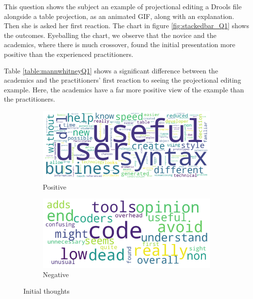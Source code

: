 This question shows the subject an example of projectional editing a Drools file alongside a table projection, as an animated GIF, along with an explanation.
Then she is asked her first reaction. 
The chart in figure \ref{fig:stackedbar_Q1} shows the outcomes.
Eyeballing the chart, we observe that the novice and the academics, where there is much crossover, found the initial presentation more positive than the experienced practitioners.

Table \ref{table:mannwhitneyQ1} shows a significant difference between the academics and the practitioners' first reaction to seeing the projectional editing example.
Here, the academics have a far more positive view of the example than the practitioners.

\begin{figure}
    \begin{subfigure}{.60\textwidth}
      \centering
      \includegraphics[width=.95\linewidth]{Sections/images/positive_wordcloud.png}
      \caption{Positive}
      \label{fig:wfig1}
    \end{subfigure}%
    \begin{subfigure}{.40\textwidth}
      \centering
      \includegraphics[width=.95\linewidth]{Sections/images/negative_wordcloud.png}
      \caption{Negative}
      \label{fig:wfig2}
    \end{subfigure}
    \caption{Initial thoughts}
    \label{fig:wordclouds}
\end{figure}

